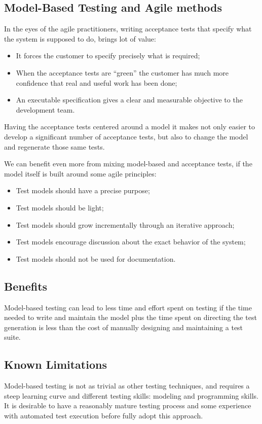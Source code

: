 \subsection{Model-Based Testing and Agile methods}
In the eyes of the agile practitioners, writing acceptance tests
that specify what the system is supposed to do, brings lot of value:
\begin{itemize}
\item It forces the customer to specify precisely what is required;
\item When the acceptance tests are “green” the customer has much 
more confidence that real and useful work has been done;
\item An executable specification gives a clear and measurable 
objective to the development team.
\end{itemize}

Having the acceptance tests centered around a model it makes 
not only easier to develop a significant number of acceptance tests,
but also to change the model and regenerate those same tests.

We can benefit even more from mixing model-based and acceptance tests, if the model itself is built around some agile principles:
\begin{itemize}
\item Test models should have a precise purpose;
\item Test models should be light; 
\item Test models should grow incrementally through an iterative approach;
\item Test models encourage discussion about the exact behavior of the system;
\item Test models should not be used for documentation.
\end{itemize}

\subsection{Benefits}
Model-based testing can lead to less time and effort spent
on testing if the time needed to write and maintain the model 
plus the time spent on directing the test generation is less 
than the cost of manually designing and maintaining a test suite.

\subsection{Known Limitations}
Model-based testing is not as trivial as other testing techniques,
and requires a steep learning curve and different testing 
skills: modeling and programming skills. It is desirable to have 
a reasonably mature testing process and some experience with 
automated test execution before fully adopt this approach.

